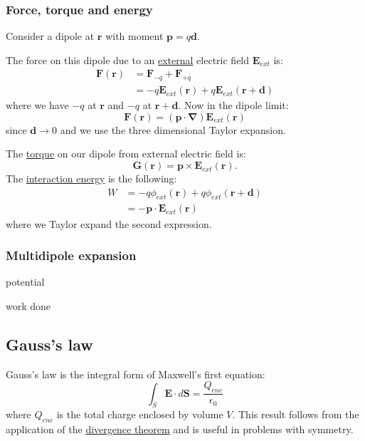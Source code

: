 \documentclass{article}
\begin{document}
\newpage

\subsubsection{Force, torque and energy}

Consider a dipole at $\boldsymbol{r}$ with moment $\boldsymbol{p}=q\boldsymbol{d}$.

The force on this dipole due to an
\underline{external} electric field $\boldsymbol{E}_{ext}$ is:
\begin{align*}
    \boldsymbol{F}(\boldsymbol{r})
    &=\boldsymbol{F}_{-q}+\boldsymbol{F}_{+q} \\
    &=-q\boldsymbol{E}_{ext}(\boldsymbol{r})
    +q\boldsymbol{E}_{ext}(\boldsymbol{r}+\boldsymbol{d})
\end{align*}
where we have $-q$ at $\boldsymbol{r}$ and $-q$ at $\boldsymbol{r}+\boldsymbol{d}$.
Now in the dipole limit:
$$\boldsymbol{F}(\boldsymbol{r})
=(\boldsymbol{p}\cdot\boldsymbol{\nabla})
\boldsymbol{E}_{ext}(\boldsymbol{r})$$
since $\boldsymbol{d}\rightarrow0$ and we use the three dimensional Taylor expansion.

The \underline{torque} on our dipole from external electric field is:
$$\boldsymbol{G}(\boldsymbol{r})
=\boldsymbol{p}\times\boldsymbol{E}_{ext}(\boldsymbol{r}).$$
The \underline{interaction energy} is the following:
\begin{align*}
    W
    &=-q\phi_{ext}(\boldsymbol{r})
    +q\phi_{ext}(\boldsymbol{r}+\boldsymbol{d}) \\
    &=-\boldsymbol{p}\cdot
    \boldsymbol{E}_{ext}(\boldsymbol{r})
\end{align*}
where we Taylor expand the second expression.

\newpage

\subsubsection{Multidipole expansion}

potential

work done

\newpage

\subsection{Gauss's law}
Gauss's law is the integral form of Maxwell's first equation:
$$\int_S\boldsymbol{E}\cdot d\boldsymbol{S}
=\frac{Q_{enc}}{\epsilon_0}$$
where $Q_{enc}$ is the total charge enclosed by volume $V$. This result follows from the application of the \underline{divergence theorem} and is useful in problems with symmetry. 
\end{document}
